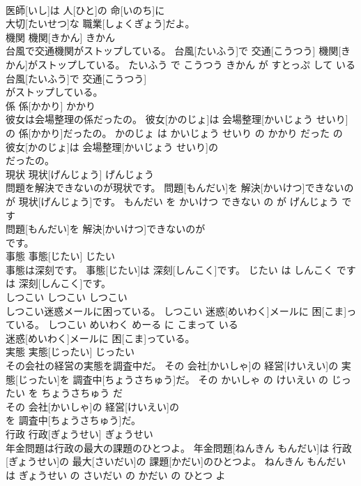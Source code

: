 \documentclass[8pt]{extreport}
\begin{document}
\begin{CJK}{UTF8}{min}
\\	医師[いし]は 人[ひと]の 命[いのち]に
\\	大切[たいせつ]な 職業[しょくぎょう]だよ。			
\\	機関	機関[きかん]	きかん	
\\	台風で交通機関がストップしている。	台風[たいふう]で 交通[こうつう] 機関[きかん]がストップしている。	たいふう で こうつう きかん が すとっぷ して いる	
\\	台風[たいふう]で 交通[こうつう]
\\	がストップしている。			
\\	係	係[かかり]	かかり	
\\	彼女は会場整理の係だったの。	彼女[かのじょ]は 会場整理[かいじょう せいり]の 係[かかり]だったの。	かのじょ は かいじょう せいり の かかり だった の	
\\	彼女[かのじょ]は 会場整理[かいじょう せいり]の
\\	だったの。			
\\	現状	現状[げんじょう]	げんじょう	
\\	問題を解決できないのが現状です。	問題[もんだい]を 解決[かいけつ]できないのが 現状[げんじょう]です。	もんだい を かいけつ できない の が げんじょう です	
\\	問題[もんだい]を 解決[かいけつ]できないのが
\\	です。			
\\	事態	事態[じたい]	じたい	
\\	事態は深刻です。	事態[じたい]は 深刻[しんこく]です。	じたい は しんこく です	
\\	は 深刻[しんこく]です。			
\\	しつこい	しつこい	しつこい	
\\	しつこい迷惑メールに困っている。	しつこい 迷惑[めいわく]メールに 困[こま]っている。	しつこい めいわく めーる に こまって いる	
\\	迷惑[めいわく]メールに 困[こま]っている。			
\\	実態	実態[じったい]	じったい	
\\	その会社の経営の実態を調査中だ。	その 会社[かいしゃ]の 経営[けいえい]の 実態[じったい]を 調査中[ちょうさちゅう]だ。	その かいしゃ の けいえい の じったい を ちょうさちゅう だ	
\\	その 会社[かいしゃ]の 経営[けいえい]の
\\	を 調査中[ちょうさちゅう]だ。			
\\	行政	行政[ぎょうせい]	ぎょうせい	
\\	年金問題は行政の最大の課題のひとつよ。	年金問題[ねんきん もんだい]は 行政[ぎょうせい]の 最大[さいだい]の 課題[かだい]のひとつよ。	ねんきん もんだい は ぎょうせい の さいだい の かだい の ひとつ よ	

\end{CJK}
\end{document}
